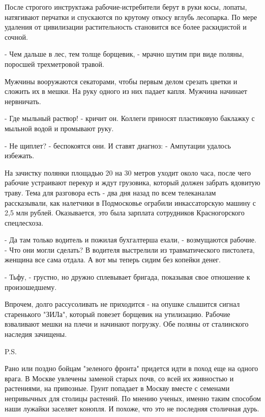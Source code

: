 \begin{itemize}
\begin{multicols}{2}
После строгого инструктажа рабочие-истребители берут в руки косы, лопаты,
натягивают перчатки и спускаются по крутому откосу вглубь лесопарка. По мере
удаления от цивилизации растительность становится все более раскидистой и
сочной.

- Чем дальше в лес, тем толще борщевик, - мрачно шутим при виде поляны,
поросшей трехметровой травой.

Мужчины вооружаются секаторами, чтобы первым делом срезать цветки и сложить их
в мешки. На руку одного из них падает капля. Мужчина начинает нервничать.

- Где мыльный раствор! - кричит он. Коллеги приносят пластиковую баклажку с
мыльной водой и промывают руку.

- Не щиплет? - беспокоятся они. И ставят диагноз: - Ампутации удалось избежать.

На зачистку полянки площадью 20 на 30 метров уходит около часа, после чего
рабочие устраивают перекур и ждут грузовика, который должен забрать ядовитую
траву. Тема для разговора есть - два дня назад по всем телеканалам
рассказывали, как налетчики в Подмосковье ограбили инкассаторскую машину с 2,5
млн рублей. Оказывается, это была зарплата сотрудников Красногорского
спецлесхоза.

- Да там только водитель и пожилая бухгалтерша ехали, - возмущаются рабочие. -
Что они могли сделать? В водителя выстрелили из травматического пистолета,
женщина все сама отдала. А вот мы теперь сидим без копейки денег.

- Тьфу, - грустно, но дружно сплевывает бригада, показывая свое отношение к
произошедшему.

Впрочем, долго рассусоливать не приходится - на опушке слышится сигнал
старенького "ЗИЛа", который повезет борщевик на утилизацию. Рабочие взваливают
мешки на плечи и начинают погрузку. Обе поляны от сталинского наследия
зачищены.

P.S.

Рано или поздно бойцам "зеленого фронта" придется идти в поход еще на одного
врага. В Москве увлечены заменой старых почв, со всей их живностью и
растениями, на привозные. Грунт попадает в Москву вместе с семенами непривычных
для столицы растений. По мнению ученых, именно таким способом наши лужайки
заселяет конопля. И похоже, что это не последняя столичная дурь.



\end{multicols}
\end{itemize}
